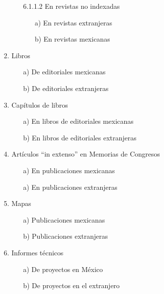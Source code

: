 \documentclass[12pt]{report}
\begin{document}
\begin{enumerate}
\begin{enumerate}
\begin{enumerate}
\begin{enumerate}
        						\item[6.1.1.2] En revistas no indexadas
        							\begin{itemize}
        								\item[a)] En revistas extranjeras
        								\item[b)] En revistas mexicanas \\
        							\end{itemize}
        					\end{enumerate}
        				\item Libros  %
        					\begin{itemize}
        					\item[a)] De editoriales mexicanas
        					\item[b)] De editoriales extranjeras \\
        					\end{itemize}

        				\item Capítulos de libros
        					\begin{itemize}
        					\item[a)] En libros de editoriales mexicanas
        					\item[b)] En libros de editoriales extranjeras \\
        					\end{itemize}

        				\item Artículos ``in extenso'' en Memorias de Congresos
        					\begin{itemize}
        					\item[a)] En publicaciones mexicanas
        					\item[a)] En publicaciones extranjeras \\
        					\end{itemize}

        				\item Mapas
        					\begin{itemize}
        					\item[a)] Publicaciones mexicanas
        					\item[b)] Publicaciones extranjeras \\
        					\end{itemize}

        				\item Informes técnicos
        					\begin{itemize}
        					\item[a)] De proyectos en México
        					\item[b)] De proyectos en el extranjero \\
        					\end{itemize}
        			\end{enumerate}


\end{enumerate}
\end{enumerate}
\end{document}
